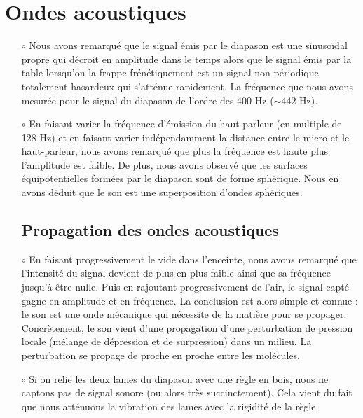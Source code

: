 \documentclass[12pt,a4paper]{article}
\begin{document}
	\section{Ondes acoustiques}
	\begin{itemize}
		
		\subsection{Production et nature du son}
		\item[$\circ$] Nous avons remarqué que le signal émis par le diapason est une sinusoïdal propre qui décroit en amplitude dans le temps alors que le signal émis par la table lorsqu'on la frappe frénétiquement est un signal non périodique totalement hasardeux qui s'atténue rapidement. La fréquence que nous avons mesurée pour le signal du diapason de l'ordre des 400 Hz ($\sim 442$ Hz).
		\\
		
		\item[$\circ$] En faisant varier la fréquence d'émission du haut-parleur (en multiple de 128 Hz) et en faisant varier indépendamment la distance entre le micro et le haut-parleur, nous avons remarqué que plus la fréquence est haute plus l'amplitude est faible. De plus, nous avons observé que les surfaces équipotentielles formées par le diapason sont de forme sphérique. Nous en avons déduit que le son est une superposition d'ondes sphériques.
		
		\subsection{Propagation des ondes acoustiques}
		\item[$\circ$] En faisant progressivement le vide dans l'enceinte, nous avons remarqué que l'intensité du signal devient de plus en plus faible ainsi que sa fréquence jusqu'à être nulle. Puis en rajoutant progressivement de l'air, le signal capté gagne en amplitude et en fréquence. La conclusion est alors simple et connue : le son est une onde mécanique qui nécessite de la matière pour se propager. Concrètement, le son vient d'une propagation d'une perturbation de pression locale (mélange de dépression et de surpression) dans un milieu. La perturbation se propage de proche en proche entre les molécules.
		
		\item[$\circ$] Si on relie les deux lames du diapason avec une règle en bois, nous ne captons pas de signal sonore (ou alors très succinctement). Cela vient du fait que nous atténuons la vibration des lames avec la rigidité de la règle.
		

\end{itemize}
\end{document}
